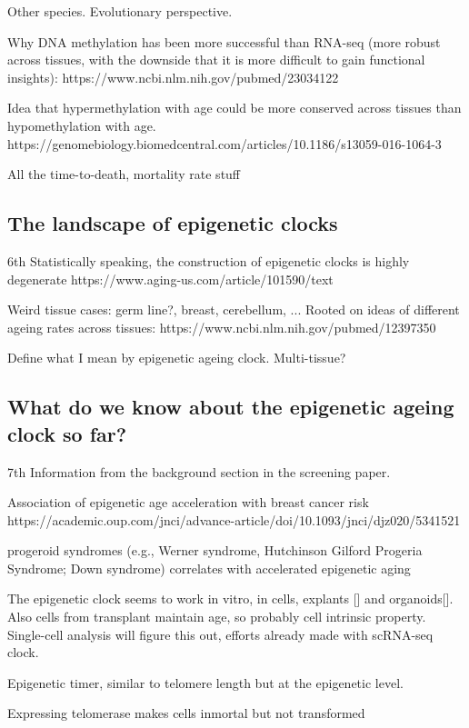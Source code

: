 Other species. Evolutionary perspective.

Why DNA methylation has been more successful than RNA-seq (more robust across tissues, with the downside that it is more difficult to gain functional insights): https://www.ncbi.nlm.nih.gov/pubmed/23034122

Idea that hypermethylation with age could be more conserved across tissues than hypomethylation with age.
https://genomebiology.biomedcentral.com/articles/10.1186/s13059-016-1064-3

All the time-to-death, mortality rate stuff


\subsection{The landscape of epigenetic clocks}

6th
Statistically speaking, the construction of epigenetic clocks is highly degenerate
https://www.aging-us.com/article/101590/text

Weird tissue cases: germ line?, breast, cerebellum, ...
Rooted on ideas of different ageing rates across tissues:
https://www.ncbi.nlm.nih.gov/pubmed/12397350

Define what I mean by epigenetic ageing clock. Multi-tissue? 


\subsection{What do we know about the epigenetic ageing clock so far?}

7th
Information from the background section in the screening paper.

Association of epigenetic age acceleration with breast cancer risk https://academic.oup.com/jnci/advance-article/doi/10.1093/jnci/djz020/5341521

progeroid syndromes (e.g., Werner syndrome, Hutchinson Gilford Progeria Syndrome; Down syndrome) correlates with accelerated epigenetic aging

The epigenetic clock seems to work in vitro, in cells, explants [] and organoids[]. Also cells from transplant maintain age, so probably cell intrinsic property. Single-cell analysis will figure this out, efforts already made with scRNA-seq clock.

Epigenetic timer, similar to telomere length but at the epigenetic level.

Expressing telomerase makes cells inmortal but not transformed 


